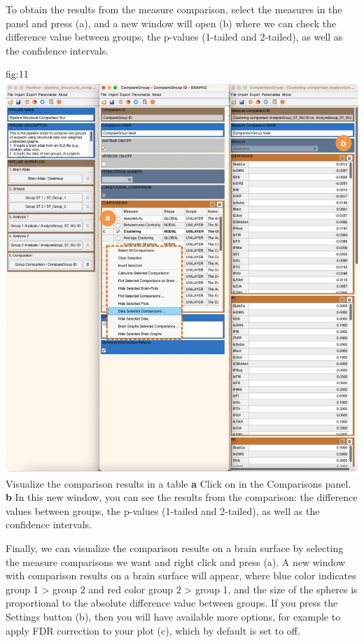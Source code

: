 \documentclass[justified]{tufte-handout}
\begin{document}
 
To obtain the results from the measure comparison, select the measures in the  panel and press  (a), and a new window will open (b) where we can check the difference value between groups, the p-values (1-tailed and 2-tailed), as well as the confidence intervals.

	{fig:11}
	{\includegraphics{fig11.jpg}}
	{Visualize the comparison results in a table}
	{
	{\bf a} Click on  in the Comparisons panel.
	{\bf b} In this new window, you can see the results from the comparison: the difference values between groups, the p-values (1-tailed and 2-tailed), as well as the confidence intervals.
	}


Finally, we can visualize the comparison results on a brain surface by selecting the measure comparisons we want and right click and press  (a). A new window with comparison results on a brain surface will appear, where blue color indicates group 1 > group 2 and red color group 2 > group 1, and the size of the spheres is proportional to the absolute difference value between groups. If you press the Settings button (b), then you will have available more options, for example to apply FDR correction to your plot (c), which by default is set to off.
\end{document}
